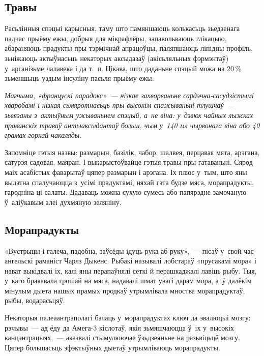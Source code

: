 \subsection*{Травы}

Расьлінныя спэцыі карысныя, таму што памяншаюць колькасьць зьедзенага падчас прыёму ежы, добрыя для мікрафлёры, запавольваюць глікацыю, абараняюць прадукты пры тэрмічнай апрацоўцы, паляпшаюць ліпідны профіль, зьніжаюць актыўнасьць некаторых аксыдазаў (акісьляльных фэрмэнтаў) у~арганізьме чалавека і да т.~п. Цікава, што даданьне спэцый можа на 20\,\% зьменшыць уздым інсуліну пасьля прыёму ежы.

\emph{Магчыма, «францускі парадокс»~--- нізкае захворваньне сар\-дэч\-на-сасудзістымі хваробамі і нізкая сьмяротнасьць пры высокім спажываньні тлушчаў~--- зьвязаны з~актыўным ужываньнем спэцый, а~не віна: у~дзвюх чайных лыжках праванскіх траваў антыаксыдантаў больш, чым у~140 мл чырвонага віна або 40 грамах горкай чакаляды.}

Запомніце гэтыя назвы: размарын, базілік, чабор, шалвея, перцавая мята, арэгана, сатурэя садовая, маяран. І выкарыстоўвайце гэтыя травы пры гатаваньні. Сярод маіх асабістых фаварытаў цяпер размарын і арэгана. Іх плюс у~тым, што яны выдатна спалучаюцца з~усімі прадуктамі, няхай гэта будзе мяса, морапрадукты, гародніна ці салаты. Дадаваць можна сухую сумесь або папярэдне замочаную ў~аліўкавым алеі духмяную зеляніну.

\subsection*{Морапрадукты}

«Вустрыцы і галеча, падобна, заўсёды ідуць рука аб руку»,~--- пісаў у~свой час ангельскі раманіст Чарлз Дыкенс. Рыбакі называлі лобстараў «прусакамі мора» і нават выкідвалі іх, калі яны перапаўнялі сеткі й перашкаджалі лавіць рыбу. Тыя, у~каго бракавала грошай на мяса, надавалі шмат увагі дарам мора, а~ў далёкім мінулым дыета нашых прамых продкаў утрымлівала мноства морапрадуктаў, рыбы, водарасьцяў.

Некаторыя палеаантраполагі бачаць у~морапрадуктах ключ да эвалюцыі мозгу: рэчывы~--- ад ёду да Амега-3 кіслотаў, якія зьмяшчаюцца ў~іх у~высокіх канцэнтрацыях,~--- аказвалі стымулюючае ўзьдзеяньне на разьвіцьцё мозгу. Цяпер большасьць эфэктыўных дыетаў утрымліваюць морапрадукты. 


